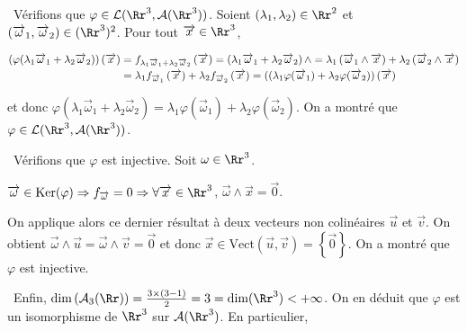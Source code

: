 {\begin{enumerate}
{\textbullet~Vérifions que $\varphi\in\mathcal{L}(\Rr^3,\mathcal{A}(\Rr^3))$. Soient $(\lambda_1,\lambda_2)\in\Rr^2$ et $(\overrightarrow{\omega}_1,\overrightarrow{\omega}_2)\in(\Rr^3)^2$. Pour tout $\overrightarrow{x}\in\Rr^3$,

\begin{align*}\ensuremath
\left(\varphi(\lambda_1\overrightarrow{\omega}_1+\lambda_2\overrightarrow{\omega}_2)\right)\left(\overrightarrow{x}\right)&=f_{\lambda_1\overrightarrow{\omega}_1+\lambda_2\overrightarrow{\omega}_2}\left(\overrightarrow{x}\right)=\left(\lambda_1\overrightarrow{\omega}_1+\lambda_2\overrightarrow{\omega}_2\right)\wedge=\lambda_1\left(\overrightarrow{\omega}_1\wedge\overrightarrow{x}\right)+\lambda_2\left(\overrightarrow{\omega}_2\wedge\overrightarrow{x}\right)\\
 &=\lambda_1f_{\overrightarrow{\omega}_1}\left(\overrightarrow{x}\right)+\lambda_2f_{\overrightarrow{\omega}_2}\left(\overrightarrow{x}\right)=\left((\lambda_1\varphi(\overrightarrow{\omega}_1)+\lambda_2\varphi(\overrightarrow{\omega}_2)\right)\left(\overrightarrow{x}\right)
\end{align*}

et donc $\varphi(\lambda_1\overrightarrow{\omega}_1+\lambda_2\overrightarrow{\omega}_2)=\lambda_1\varphi(\overrightarrow{\omega}_1)+\lambda_2\varphi(\overrightarrow{\omega}_2)$. On a montré que $\varphi\in\mathcal{L}(\Rr^3,\mathcal{A}(\Rr^3))$.

\textbullet~Vérifions que $\varphi$ est injective. Soit $\omega\in\Rr^3$.

\begin{center}
$\overrightarrow{\omega}\in\text{Ker}(\varphi)\Rightarrow f_{\overrightarrow{\omega}}=0\Rightarrow\forall\overrightarrow{x}\in\Rr^3$, $\overrightarrow{\omega}\wedge\overrightarrow{x}=\overrightarrow{0}$.
\end{center}

On applique alors ce dernier résultat à deux vecteurs non colinéaires $\overrightarrow{u}$ et $\overrightarrow{v}$. On obtient $\overrightarrow{\omega}\wedge\overrightarrow{u}=\overrightarrow{\omega}\wedge\overrightarrow{v}=\overrightarrow{0}$ et donc $\overrightarrow{x}\in\text{Vect}\left(\overrightarrow{u},\overrightarrow{v}\right)=\left\{\overrightarrow{0}\right\}$. On a montré que $\varphi$ est injective.

\textbullet~Enfin, $\text{dim}\left(\mathcal{A}_3(\Rr)\right)= \frac{3\times(3-1)}{2}=3=\text{dim}(\Rr^3)<+\infty$. On en déduit que $\varphi$ est un isomorphisme de $\Rr^3$ sur $\mathcal{A}(\Rr^3)$. En particulier,

\begin{center}
\end{center}}
\end{enumerate}
}
